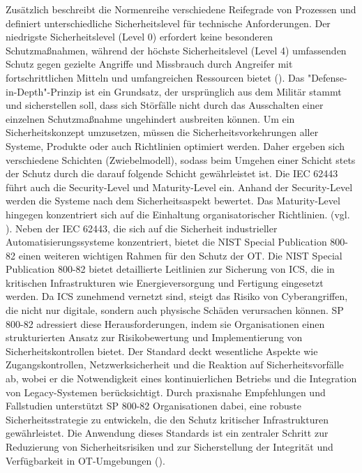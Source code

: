 Zusätzlich beschreibt die Normenreihe verschiedene Reifegrade von Prozessen und definiert unterschiedliche Sicherheitslevel für technische Anforderungen. Der niedrigste Sicherheitslevel (Level 0) erfordert keine besonderen Schutzmaßnahmen, während der höchste Sicherheitslevel (Level 4) umfassenden Schutz gegen gezielte Angriffe und Missbrauch durch Angreifer mit fortschrittlichen Mitteln und umfangreichen Ressourcen bietet (\cite{ISecInsider}). Das "Defense-in-Depth"-Prinzip ist ein Grundsatz, der ursprünglich aus dem Militär stammt und sicherstellen soll, dass sich Störfälle nicht durch das Ausschalten einer einzelnen Schutzmaßnahme ungehindert ausbreiten können. Um ein Sicherheitskonzept umzusetzen, müssen die Sicherheitsvorkehrungen aller Systeme, Produkte oder auch Richtlinien optimiert werden. Daher ergeben sich verschiedene Schichten (Zwiebelmodell), sodass beim Umgehen einer Schicht stets der Schutz durch die darauf folgende Schicht gewährleistet ist. Die IEC 62443 führt auch die Security-Level und Maturity-Level ein. Anhand der Security-Level werden die Systeme nach dem Sicherheitsaspekt bewertet. Das Maturity-Level hingegen konzentriert sich auf die Einhaltung organisatorischer Richtlinien. (vgl. \cite{sichereIndustrie3}). Neben der IEC 62443, die sich auf die Sicherheit industrieller Automatisierungssysteme konzentriert, bietet die NIST Special Publication 800-82 einen weiteren wichtigen Rahmen für den Schutz der OT. Die NIST Special Publication 800-82 bietet detaillierte Leitlinien zur Sicherung von ICS, die in kritischen Infrastrukturen wie Energieversorgung und Fertigung eingesetzt werden. \clearpage \noindent Da ICS zunehmend vernetzt sind, steigt das Risiko von Cyberangriffen, die nicht nur digitale, sondern auch physische Schäden verursachen können. SP 800-82 adressiert diese Herausforderungen, indem sie Organisationen einen strukturierten Ansatz zur Risikobewertung und Implementierung von Sicherheitskontrollen bietet. Der Standard deckt wesentliche Aspekte wie Zugangskontrollen, Netzwerksicherheit und die Reaktion auf Sicherheitsvorfälle ab, wobei er die Notwendigkeit eines kontinuierlichen Betriebs und die Integration von Legacy-Systemen berücksichtigt. Durch praxisnahe Empfehlungen und Fallstudien unterstützt SP 800-82 Organisationen dabei, eine robuste Sicherheitsstrategie zu entwickeln, die den Schutz kritischer Infrastrukturen gewährleistet. Die Anwendung dieses Standards ist ein zentraler Schritt zur Reduzierung von Sicherheitsrisiken und zur Sicherstellung der Integrität und Verfügbarkeit in OT-Umgebungen (\cite{NIST}).

